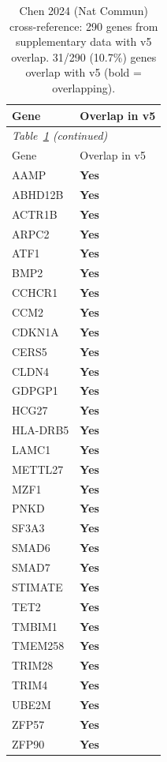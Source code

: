 \begin{longtable}{ll}
\caption{Chen 2024 (Nat Commun) cross-reference: 290 genes from supplementary data with v5 overlap. 31/290 (10.7\%) genes overlap with v5 (bold = overlapping).}\label{tab:chen2024_overlap}\\
\toprule
  Gene & Overlap in v5 \\
\midrule
\endfirsthead
\multicolumn{2}{l}{\textit{Table~\ref{tab:chen2024_overlap} (continued)}} \\
\toprule
  Gene & Overlap in v5 \\
\midrule
\endhead
\bottomrule
\endfoot
  AAMP & \textbf{Yes} \\
  ABHD12B & \textbf{Yes} \\
  ACTR1B & \textbf{Yes} \\
  ARPC2 & \textbf{Yes} \\
  ATF1 & \textbf{Yes} \\
  BMP2 & \textbf{Yes} \\
  CCHCR1 & \textbf{Yes} \\
  CCM2 & \textbf{Yes} \\
  CDKN1A & \textbf{Yes} \\
  CERS5 & \textbf{Yes} \\
  CLDN4 & \textbf{Yes} \\
  GDPGP1 & \textbf{Yes} \\
  HCG27 & \textbf{Yes} \\
  HLA-DRB5 & \textbf{Yes} \\
  LAMC1 & \textbf{Yes} \\
  METTL27 & \textbf{Yes} \\
  MZF1 & \textbf{Yes} \\
  PNKD & \textbf{Yes} \\
  SF3A3 & \textbf{Yes} \\
  SMAD6 & \textbf{Yes} \\
  SMAD7 & \textbf{Yes} \\
  STIMATE & \textbf{Yes} \\
  TET2 & \textbf{Yes} \\
  TMBIM1 & \textbf{Yes} \\
  TMEM258 & \textbf{Yes} \\
  TRIM28 & \textbf{Yes} \\
  TRIM4 & \textbf{Yes} \\
  UBE2M & \textbf{Yes} \\
  ZFP57 & \textbf{Yes} \\
  ZFP90 & \textbf{Yes} \\

\end{longtable}
